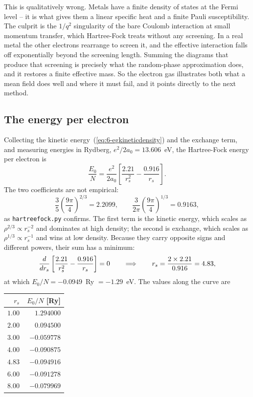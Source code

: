 This is qualitatively wrong.  Metals have a finite density of states at the
Fermi level -- it is what gives them a linear specific heat and a finite Pauli
susceptibility.  The culprit is the $1/q^2$ singularity of the bare Coulomb
interaction at small momentum transfer, which Hartree-Fock treats without any
screening.  In a real metal the other electrons rearrange to screen it, and
the effective interaction falls off exponentially beyond the screening length.
Summing the diagrams that produce that screening is precisely what the
random-phase approximation does, and it restores a finite effective mass.  So
the electron gas illustrates both what a mean field does well and where it
must fail, and it points directly to the next method.

\subsection{The energy per electron}
\label{sec:egenergy}

Collecting the kinetic energy~(\ref{eq:6-egkineticdensity}) and the exchange
term, and measuring energies in Rydberg, $e^2/2a_0=13.606$~eV, the
Hartree-Fock energy per electron is
\begin{equation}
  \boxed{\;
  \frac{E_0}{N} = \frac{e^2}{2a_0}
    \left[\frac{2.21}{r_s^2}-\frac{0.916}{r_s}\right].
  \;}
  \label{eq:6-egenergy}
\end{equation}
The two coefficients are not empirical:
\begin{equation}
  \frac{3}{5}\left(\frac{9\pi}{4}\right)^{2/3} = 2.2099,
  \qquad
  \frac{3}{2\pi}\left(\frac{9\pi}{4}\right)^{1/3} = 0.9163,
  \label{eq:6-egcoefficients}
\end{equation}
as \texttt{hartreefock.py} confirms.  The first term is the kinetic energy,
which scales as $\rho^{2/3}\propto r_s^{-2}$ and dominates at high density;
the second is exchange, which scales as $\rho^{1/3}\propto r_s^{-1}$ and wins
at low density.  Because they carry opposite signs and different powers, their
sum has a minimum:
\begin{equation}
  \frac{d}{dr_s}\left[\frac{2.21}{r_s^2}
    - \frac{0.916}{r_s}\right] = 0
  \qquad\Longrightarrow\qquad
  r_s = \frac{2\times2.21}{0.916} = 4.83,
  \label{eq:6-egminimum}
\end{equation}
at which $E_0/N = -0.0949$~Ry $=-1.29$~eV.  The values along the curve are

\begin{center}
\renewcommand{\arraystretch}{1.2}
\begin{tabular}{rr}
\toprule
$r_s$ & $E_0/N$ [Ry]\\
\midrule
$1.00$ & $\phantom{-}1.294000$\\
$2.00$ & $\phantom{-}0.094500$\\
$3.00$ & $-0.059778$\\
$4.00$ & $-0.090875$\\
$4.83$ & $-0.094916$\\
$6.00$ & $-0.091278$\\
$8.00$ & $-0.079969$\\
\bottomrule
\end{tabular}
\end{center}

